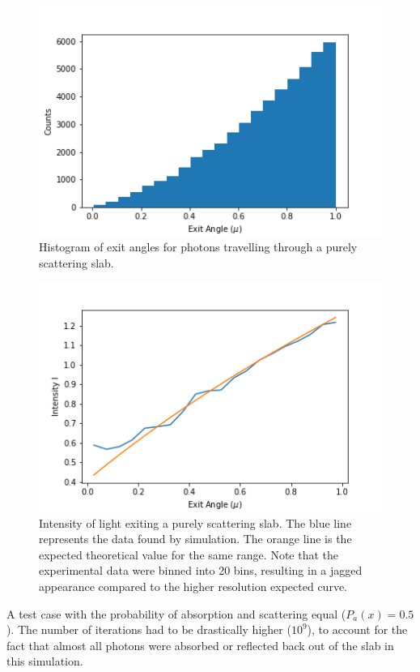 \documentclass[twocolumn]{article}
\begin{document}
\begin{figure}
\centering
\includegraphics[width=1\linewidth]{fig9}
\caption{Histogram of exit angles for photons travelling through a purely scattering slab.}
\label{fig:fig9}
\end{figure}

\begin{figure}
\centering
\includegraphics[width=1\linewidth]{fig10}
\caption{Intensity of light exiting a purely scattering slab. The blue line represents the data found by simulation. The orange line is the expected theoretical value for the same range. Note that the experimental data were binned into 20 bins, resulting in a jagged appearance compared to the higher resolution expected curve.}
\label{fig:fig10}
\end{figure}

A test case with the probability of absorption and scattering equal ($P_a(x)=0.5$). The number of iterations had to be drastically higher ($10^9$), to account for the fact that almost all photons were absorbed or reflected back out of the slab in this simulation. 
\end{document}
